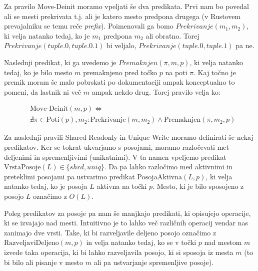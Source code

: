 \documentclass[a4paper,12pt,openright]{book}
\begin{document}
Za pravilo Move-Deinit moramo vpeljati še dva predikata. Prvi nam bo povedal ali se mesti
prekrivata t.j. ali je katero mesto predpona drugega (v Rustovem prevajalniku se temu reče \textit{prefix}). Poimenovali
ga bomo $Prekrivanje(m_{1}, m_{2})$, ki velja natanko tedaj, ko je $m_{1}$ predpona $m_{2}$ ali obratno. Torej
$Prekrivanje(tuple.0, tuple.0.1)$ bi veljalo, $Prekrivanje(tuple.0, tuple.1)$ pa ne.

Naslednji predikat, ki ga uvedemo je $Premaknjen(\pi, m, p)$, ki velja natanko tedaj, ko je bilo mesto $m$ premaknjeno
pred točko $p$ na poti $\pi$. Kaj točno je premik moram še malo pobrskati po dokumentaciji ampak konceptualno to pomeni,
da lastnik ni več $m$ ampak nekdo drug. Torej pravilo velja ko:

\begin{equation}
	\begin{aligned}
		 & \text{Move-Deinit}(m, p) \iff \\ &\nexists \pi \in \text{Poti}(p), m_{2}: \text{Prekrivanje}(m, m_{2}) \land \text{Premaknjen}(\pi, m_{2}, p)
	\end{aligned}
\end{equation}

Za naslednji pravili Shared-Readonly in Unique-Write moramo definirati še nekaj predikatov. Ker se tokrat
ukvarjamo s posojami, moramo razločevati met deljenimi in spremenljivimi (unikatnimi). V ta namen vpeljemo
predikat $\text{VrstaPosoje}(L) \in \{shrd, uniq\}$. Da pa lahko razločimo med aktivnimi in preteklimi posojami
pa ustvarimo predikat $\text{PosojaAktivna}(L,p)$, ki velja natanko tedaj, ko je posoja $L$ aktivna na točki $p$.
Mesto, ki je bilo sposojeno z posojo $L$ označimo z $O(L)$.

Poleg predikatov za posoje pa nam še manjkajo predikati, ki opisujejo operacije, ki se izvajajo nad mesti.
Intuitivno je to lahko več različnih operacij vendar nas zanimajo dve vrsti. Take, ki bi razveljavile deljeno
posojo označimo z $\text{RazveljaviDeljeno}(m,p)$ in velja natanko tedaj, ko se v točki $p$ nad mestom $m$ izvede
taka operacija, ki bi lahko razveljavila posojo, ki si sposoja iz mesta $m$ (to bi bilo ali pisanje v mesto $m$ ali
pa ustvarjanje spremenljive posoje).
\end{document}
